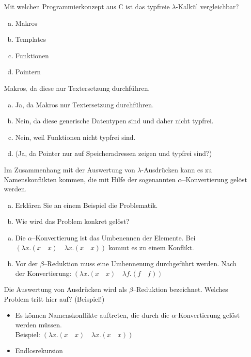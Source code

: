 \begin{card}
  Mit welchen Programmierkonzept aus C ist das typfreie $\lambda$-Kalkül vergleichbar?
  \begin{enumerate}[a)]
    \item Makros
    \item Templates
    \item Funktionen
    \item Pointern
  \end{enumerate}
  \hr
  Makros, da diese nur Textersetzung durchführen.
  \begin{enumerate}[a)]
    \item Ja, da Makros nur Textersetzung durchführen.
    \item Nein, da diese generische Datentypen sind und daher nicht typfrei.
    \item Nein, weil Funktionen nicht typfrei sind.
    \item (Ja, da Pointer nur auf Speicheradressen zeigen und typfrei sind?)
  \end{enumerate}
\end{card}

\begin{card}
  Im Zusammenhang mit der Auswertung von $\lambda$-Ausdrücken kann es zu Namenskonflikten kommen, die mit Hilfe der sogenannten
  $\alpha$--Konvertierung gelöst werden.
  \begin{enumerate}[a)]
    \item Erklären Sie an einem Beispiel die Problematik.
    \item Wie wird das Problem konkret gelöst?
  \end{enumerate}
  \hr
  \begin{enumerate}[a)]
    \item Die $\alpha$--Konvertierung ist das Umbenennen der Elemente. Bei $(\lambda x.(x \quad x) \quad \lambda x.(x \quad x))$ kommt es zu einem Konflikt.
    \item Vor der $\beta$--Reduktion muss eine Umbennenung durchgeführt werden. Nach der Konvertierung: $(\lambda x.(x \quad x) \quad \lambda f.(f \quad f))$
  \end{enumerate}
\end{card}

\begin{card}
  Die Auswertung von Ausdrücken wird als $\beta$–Reduktion bezeichnet. Welches Problem tritt hier auf? (Beispiel!)
  \hr
  \begin{itemize}
    \item Es können Namenskonflikte auftreten, die durch die $\alpha$-Konvertierung gelöst werden müssen.\\
      Beispiel: $(\lambda x.(x \quad x) \quad \lambda x.(x \quad x))$
    \item Endlosrekursion
  \end{itemize}
\end{card}

